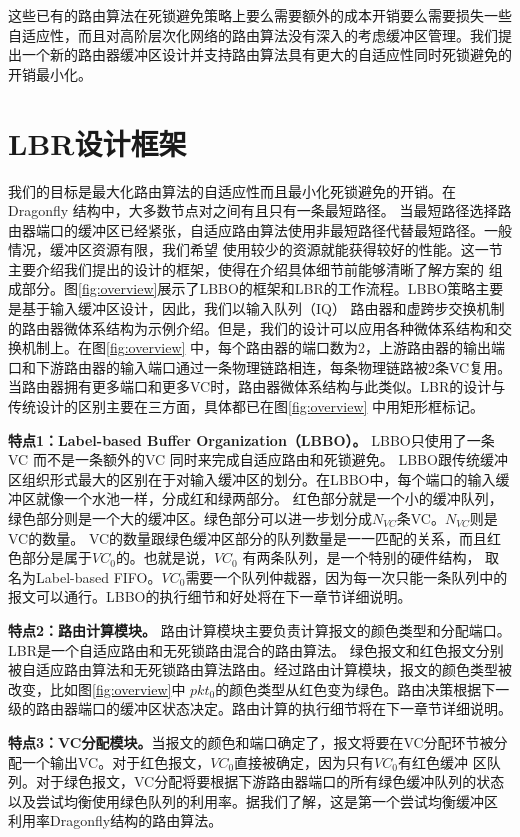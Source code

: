 这些已有的路由算法在死锁避免策略上要么需要额外的成本开销要么需要损失一些自适应性，而且对高阶层次化网络的路由算法没有深入的考虑缓冲区管理。我们提出一个新的路由器缓冲区设计并支持路由算法具有更大的自适应性同时死锁避免的开销最小化。

\section{LBR设计框架}

我们的目标是最大化路由算法的自适应性而且最小化死锁避免的开销。在Dragonfly 结构中，大多数节点对之间有且只有一条最短路径。
当最短路径选择路由器端口的缓冲区已经紧张，自适应路由算法使用非最短路径代替最短路径。一般情况，缓冲区资源有限，我们希望
使用较少的资源就能获得较好的性能。这一节主要介绍我们提出的设计的框架，使得在介绍具体细节前能够清晰了解方案的
组成部分。图\ref{fig:overview}展示了LBBO的框架和LBR的工作流程。LBBO策略主要是基于输入缓冲区设计，因此，我们以输入队列（IQ）
路由器和虚跨步交换机制的路由器微体系结构为示例介绍。但是，我们的设计可以应用各种微体系结构和交换机制上。在图\ref{fig:overview}
中，每个路由器的端口数为2，上游路由器的输出端口和下游路由器的输入端口通过一条物理链路相连，每条物理链路被2条VC复用。
当路由器拥有更多端口和更多VC时，路由器微体系结构与此类似。LBR的设计与传统设计的区别主要在三方面，具体都已在图\ref{fig:overview}
中用矩形框标记。

\textbf{特点1：Label-based Buffer Organization（LBBO）。} LBBO只使用了一条VC 而不是一条额外的VC 同时来完成自适应路由和死锁避免。
LBBO跟传统缓冲区组织形式最大的区别在于对输入缓冲区的划分。在LBBO中，每个端口的输入缓冲区就像一个水池一样，分成红和绿两部分。
红色部分就是一个小的缓冲队列，绿色部分则是一个大的缓冲区。绿色部分可以进一步划分成$N_{VC}$条VC。$N_{VC}$则是VC的数量。
VC的数量跟绿色缓冲区部分的队列数量是一一匹配的关系，而且红色部分是属于$VC_0$的。也就是说，$VC_0$ 有两条队列，是一个特别的硬件结构，
取名为Label-based FIFO。$VC_0$需要一个队列仲裁器，因为每一次只能一条队列中的报文可以通行。LBBO的执行细节和好处将在下一章节详细说明。


\textbf{特点2：路由计算模块。} 路由计算模块主要负责计算报文的颜色类型和分配端口。LBR是一个自适应路由和无死锁路由混合的路由算法。
绿色报文和红色报文分别被自适应路由算法和无死锁路由算法路由。经过路由计算模块，报文的颜色类型被改变，比如图\ref{fig:overview}中
$pkt_0$的颜色类型从红色变为绿色。路由决策根据下一级的路由器端口的缓冲区状态决定。路由计算的执行细节将在下一章节详细说明。


\textbf{特点3：VC分配模块。}当报文的颜色和端口确定了，报文将要在VC分配环节被分配一个输出VC。对于红色报文，$VC_0$直接被确定，因为只有$VC_0$有红色缓冲
区队列。对于绿色报文，VC分配将要根据下游路由器端口的所有绿色缓冲队列的状态以及尝试均衡使用绿色队列的利用率。据我们了解，这是第一个尝试均衡缓冲区
利用率Dragonfly结构的路由算法。

